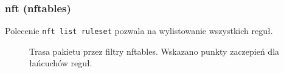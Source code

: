 % 
% 
% 
% 

\subsubsection{nft (nftables)}

Polecenie \Verb#nft list ruleset# pozwala na wylistowanie wszystkich reguł.

\begin{figure}[h!]

\caption{Trasa pakietu przez filtry nftables. Wskazano punkty zaczepień dla łańcuchów reguł.}
\end{figure}

